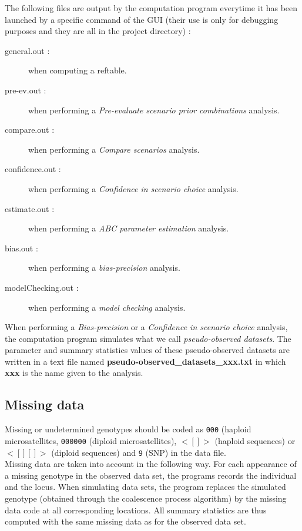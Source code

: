 The following files are output by the computation program everytime it has been launched by a specific command of the GUI (their use is only for debugging purposes and they are all in the project directory) :
\begin{description}
 \item [general.out :] when computing a reftable.
 \item [pre-ev.out :] when performing a \textit{Pre-evaluate scenario prior combinations} analysis.
 \item [compare.out :] when performing a \textit{Compare scenarios} analysis.
 \item [confidence.out :] when performing a \textit{Confidence in scenario choice} analysis.
 \item [estimate.out :] when performing a \textit{ABC parameter estimation} analysis.
 \item [bias.out :] when performing a \textit{bias-precision} analysis.
 \item [modelChecking.out :] when performing a \textit{model checking} analysis.
\end{description}

When performing a \textit{Bias-precision} or a \textit{Confidence in scenario choice} analysis, the computation program simulates what we call \textit{pseudo-observed datasets}. The parameter and summary statistics values of these pseudo-observed datasets are written in a text file named \textbf{pseudo-observed\_datasets\_xxx.txt} in which \textbf{xxx} is the name given to the analysis.


\subsection{Missing data}
Missing or undetermined genotypes should be coded as \texttt{000} (haploid microsatellites, \texttt{000000}  (diploid microsatellites), \texttt{$<[]>$} (haploid sequences) or \texttt{$<[][]>$} (diploid sequences) and \texttt{9} (SNP) in the data file. \\
Missing data are taken into account in the following way. For each appearance of a missing genotype in the observed data set, the programs records the individual and the locus. When simulating data sets, the program replaces the simulated genotype (obtained through the coalescence process algorithm) by the missing data code at all corresponding locations. All summary statistics are thus computed with the same missing data as for the observed data set. 

